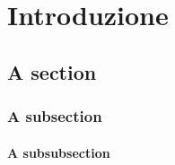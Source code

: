 \chapter{Introduzione}

\section{A section}

\lipsum[1]

\subsection{A subsection}

\lipsum[2]

\subsubsection{A subsubsection}

\lipsum[3]